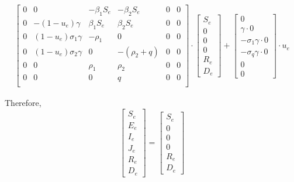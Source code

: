 \documentclass[fleqn]{article}
\begin{document}
\begin{equation*}
\begin{split}
\begin{bmatrix}
            0 & 0 & {-\beta_1 S_e} & {-\beta_2 S_e} & 0 & 0 \\
            0 & -(1 - u_e) \gamma & {\beta_1 S_e} & {\beta_2 S_e} & 0 & 0 \\
            0 & (1 - u_e) \sigma_1 \gamma & -\rho_1 & 0 & 0 & 0 \\
            0 & (1 - u_e) \sigma_2 \gamma & 0 & -(\rho_2 + q) & 0 & 0 \\
            0 & 0 & \rho_1 & \rho_2 & 0 & 0 \\
            0 & 0 & 0 & q & 0 & 0 \\
        \end{bmatrix} \cdot \begin{bmatrix}
            S_e \\
            0 \\
            0 \\
            0 \\
            R_e \\
            D_e
        \end{bmatrix} + \begin{bmatrix}
            0 \\
            \gamma \cdot 0 \\
            -\sigma_1 \gamma \cdot 0 \\
            -\sigma_q \gamma \cdot 0 \\
            0 \\
            0
        \end{bmatrix} \cdot u_e
    \end{split}
\end{equation*}

Therefore,
\begin{equation*}
    \begin{bmatrix}
        S_e \\
        E_e \\
        I_e \\
        J_e \\
        R_e \\
        D_e
    \end{bmatrix} = \begin{bmatrix}
        S_e \\
        0 \\
        0 \\
        0 \\
        R_e \\
        D_e
    \end{bmatrix}
\end{equation*}
\end{document}
